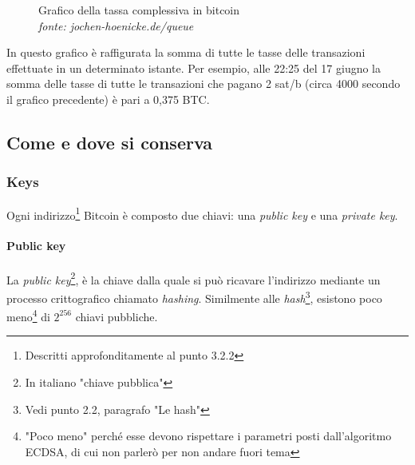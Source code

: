 \documentclass {article}
\begin{document}
\vspace {0.5cm}
\begin{figure}[htb!]
\captionsetup{width=1.4\linewidth}
\caption {Grafico della tassa complessiva in bitcoin\\\textit{fonte: jochen-hoenicke.de/queue}}
\end{figure}
\vspace {0.2cm}
\noindent
%
In questo grafico è raffigurata la somma di tutte le tasse delle transazioni effettuate in un determinato istante.
Per esempio, alle 22:25 del 17 giugno la somma delle tasse di tutte le transazioni che pagano 2 sat/b (circa 4000 secondo il grafico precedente) è pari a 0,375 BTC.


\subsection {Come e dove si conserva}


\subsubsection {Keys}

Ogni indirizzo\footnote{Descritti approfonditamente al punto 3.2.2} Bitcoin è composto due chiavi: una \textit{public key} e una \textit{private key}.

\paragraph {Public key}

La \textit{public key}\footnote{In italiano "chiave pubblica"}, è la chiave dalla quale si può ricavare l'indirizzo mediante un processo crittografico chiamato \textit{hashing}.
Similmente alle \textit{hash}\footnote{Vedi punto 2.2, paragrafo "Le hash"}, esistono poco meno\footnote{"Poco meno" perché esse devono rispettare i parametri posti dall'algoritmo ECDSA, di cui non parlerò per non andare fuori tema} di $2^{256}$ chiavi pubbliche.
\end{document}
